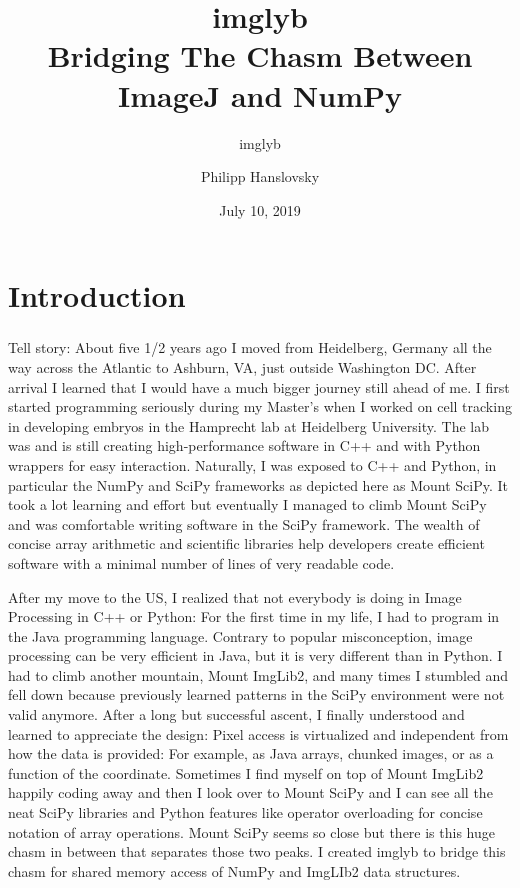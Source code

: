 \documentclass[aspectratio=169]{beamer}
\title[imglyb]{imglyb\\[0.3em]Bridging The Chasm Between ImageJ and NumPy}
\subtitle{imglyb}
\author{Philipp Hanslovsky}
\date{July 10, 2019}
\begin{document}
\setcounter{showProgressBar}{0}
\setcounter{showSlideNumbers}{0}

\maketitle

\section{Introduction}
\begin{frame}
    \frametitle{}
    Tell story: About five 1/2 years ago I moved from Heidelberg, Germany all the way across the
    Atlantic to Ashburn, VA, just outside Washington DC. After arrival I learned that I would have a
    much bigger journey still ahead of me. I first started programming seriously during my Master's
    when I worked on cell tracking in developing embryos in the Hamprecht lab at Heidelberg
    University. The lab was and is still creating high-performance software in C++ and with Python
    wrappers for easy interaction. Naturally, I was exposed to C++ and Python, in particular the
    NumPy and SciPy frameworks as depicted here as Mount SciPy. It took a lot learning and effort
    but eventually I managed to climb Mount SciPy and was comfortable writing software in
    the SciPy framework. The wealth of concise array arithmetic and scientific libraries help
    developers create efficient software with a minimal number of lines of very readable code.

    After my move to the US, I realized that not everybody is doing in Image Processing in C++ or
    Python: For the first time in my life, I had to program in the Java programming
    language. Contrary to popular misconception, image processing can be very efficient in Java, but
    it is very different than in Python. I had to climb another mountain, Mount ImgLib2, and many
    times I stumbled and fell down because previously learned patterns in the SciPy environment were
    not valid anymore. After a long but successful ascent, I finally understood and learned to
    appreciate the design: Pixel access is virtualized and independent from how the data is
    provided: For example, as Java arrays, chunked images, or as a function of the
    coordinate. Sometimes I find myself on top of Mount ImgLib2 happily coding away and then I look
    over to Mount SciPy and I can see all the neat SciPy libraries and Python features like operator
    overloading for concise notation of array operations. Mount SciPy seems so close but there is
    this huge chasm in between that separates those two peaks. I created imglyb to bridge this
    chasm for shared memory access of NumPy and ImgLIb2 data structures.


\end{frame}
\end{document}
